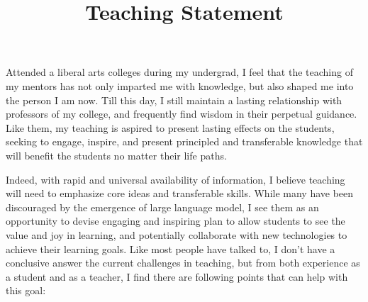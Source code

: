 \documentclass[11pt,a4paper,sans]{moderncv} %
\title{Teaching Statement}
\begin{document}
\makecvtitle %

\setlength\parskip{8px}

Attended a liberal arts colleges during my undergrad, I feel that the teaching of my mentors has not only imparted me with knowledge, but also shaped me into the person I am now.
Till this day, I still maintain a lasting relationship with professors of my college, and frequently find wisdom in their perpetual guidance.
Like them, my teaching is aspired to present lasting effects on the students, seeking to engage, inspire, and present principled and transferable knowledge that will benefit the students no matter their life paths.

Indeed, with rapid and universal availability of information, I believe teaching will need to emphasize core ideas and transferable skills.
While many have been discouraged by the emergence of large language model, I see them as an opportunity to devise engaging and inspiring plan to allow students to see the value and joy in learning, and potentially collaborate with new technologies to achieve their learning goals.
Like most people have talked to, I don't have a conclusive answer the current challenges in teaching, but from both experience as a student and as a teacher, I find there are following points that can help with this goal:
\end{document}

